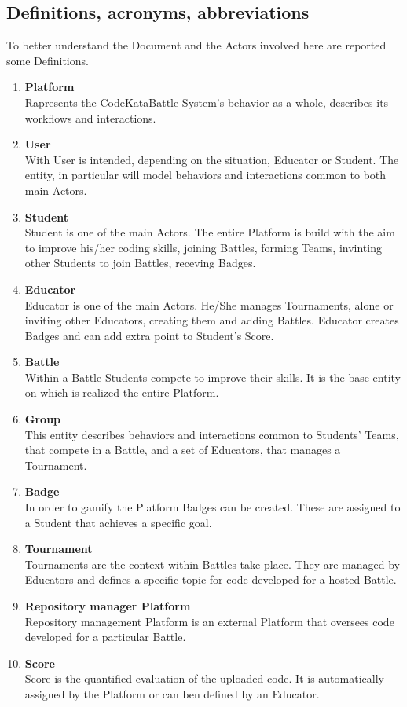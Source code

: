\subsection{Definitions, acronyms, abbreviations}
To better understand the Document and the Actors involved here are reported some Definitions.
\begin{enumerate}[label=$\bullet$]
    \item \textbf{Platform}\\Rapresents the CodeKataBattle System's behavior as a whole, describes its workflows and interactions.
    \item \textbf{User}\\With User is intended, depending on the situation, Educator or Student. The entity, in particular will model behaviors and interactions common to both main Actors.
    \item \textbf{Student}\\Student is one of the main Actors. The entire Platform is build with the aim to improve his/her coding skills, joining Battles, forming Teams, invinting other Students to join Battles, receving Badges.
    \item \textbf{Educator}\\Educator is one of the main Actors. He/She manages Tournaments, alone or inviting other Educators, creating them and adding Battles. Educator creates Badges and can add extra point to Student's Score.
    \item \textbf{Battle}\\Within a Battle Students compete to improve their skills. It is the base entity on which is realized the entire Platform.
    \item \textbf{Group}\\This entity describes behaviors and interactions common to Students' Teams, that compete in a Battle, and a set of Educators, that manages a Tournament.
    \item \textbf{Badge}\\In order to gamify the Platform Badges can be created. These are assigned to a Student that achieves a specific goal.
    \item \textbf{Tournament}\\Tournaments are the context within Battles take place. They are managed by Educators and defines a specific topic for code developed for a hosted Battle.
    \item \textbf{Repository manager Platform}\\Repository management Platform is an external Platform that oversees code developed for a particular Battle.
    \item \textbf{Score}\\Score is the quantified evaluation of the uploaded code. It is automatically assigned by the Platform or can ben defined by an Educator.
\end{enumerate}
